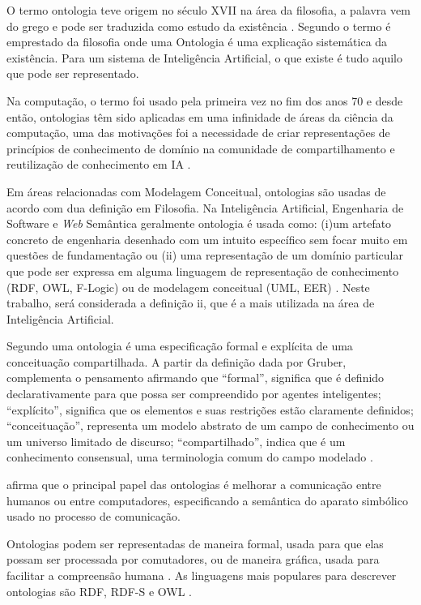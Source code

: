 \documentclass{bcc}
\begin{document}
O termo ontologia teve origem no século XVII na área da filosofia, a palavra vem do grego e pode ser traduzida como estudo da existência \cite{guizzardi2005}. Segundo \cite{gruber1995} o termo é emprestado da filosofia onde uma Ontologia é uma explicação sistemática da existência. Para um sistema de Inteligência Artificial, o que existe é tudo aquilo que pode ser representado.

Na computação, o termo foi usado pela primeira vez no fim dos anos 70 e desde então, ontologias têm sido aplicadas em uma infinidade de áreas da ciência da computação, uma das motivações foi a necessidade de criar representações de princípios de conhecimento de domínio na comunidade de compartilhamento e reutilização de conhecimento em IA \cite{guizzardi2005}.

Em áreas relacionadas com Modelagem Conceitual, ontologias são usadas de acordo com dua definição em Filosofia. Na Inteligência Artificial, Engenharia de Software e \textit{Web} Semântica geralmente ontologia é usada como: (i)um artefato concreto de engenharia desenhado com um intuito específico sem focar muito em questões de fundamentação ou (ii) uma representação de um domínio particular que pode ser expressa em alguma linguagem de representação de conhecimento (RDF, OWL, F-Logic) ou de modelagem conceitual (UML, EER) \cite{guizzardi2008}. Neste trabalho, será considerada a definição ii, que é a mais utilizada na área de Inteligência Artificial.

Segundo \cite{gruber1995} uma ontologia é uma especificação formal e explícita de uma conceituação compartilhada. A partir da definição dada por Gruber, \cite{rocha2014} complementa o pensamento afirmando que “formal”, significa que é definido declarativamente para que possa ser compreendido por agentes inteligentes; “explícito”, significa que os elementos e suas restrições estão claramente definidos; “conceituação”, representa um modelo abstrato de um campo de conhecimento ou um universo limitado de discurso; “compartilhado”, indica que é um conhecimento consensual, uma terminologia comum do campo modelado \cite{rocha2014}.

\cite{lv2011} afirma que o principal papel das ontologias é melhorar a comunicação entre humanos ou entre computadores, especificando a semântica do aparato simbólico usado no processo de comunicação.

Ontologias podem ser representadas de maneira formal, usada para que elas possam ser processada por comutadores, ou de maneira gráfica, usada para facilitar a compreensão humana \cite{isotani2015}. As linguagens mais populares para descrever ontologias são RDF, RDF-S e OWL \cite{mcguinness}.
\end{document}
